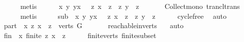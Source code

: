 \begin{isabellebody}
\ \ \ \ \isamarkupfalse%
\ metis\ \isanewline
\ \ \isamarkupfalse%
\ {\isachardoublequoteopen}{\isasymforall}\ x\ y{\isachardot}{\kern0pt}\ y{\isasymrightarrow}\isactrlsup {\isacharplus}{\kern0pt}x\ {\isasymlongrightarrow}\ \ {\isacharbraceleft}{\kern0pt}z{\isachardot}{\kern0pt}\ x\ {\isasymrightarrow}\isactrlsup {\isacharplus}{\kern0pt}\ z{\isacharbraceright}{\kern0pt}\ {\isasymsubseteq}\ {\isacharbraceleft}{\kern0pt}z{\isachardot}{\kern0pt}\ y\ {\isasymrightarrow}\isactrlsup {\isacharplus}{\kern0pt}\ z{\isacharbraceright}{\kern0pt}{\isachardoublequoteclose}\isanewline
\ \ \ \ \isamarkupfalse%
\ \ Collect{\isacharunderscore}{\kern0pt}mono\ trancl{\isacharunderscore}{\kern0pt}trans\isanewline
\ \ \ \ \isamarkupfalse%
\ metis\isanewline
\ \ \isamarkupfalse%
\ \isamarkupfalse%
\ sub{\isacharcolon}{\kern0pt}\ {\isachardoublequoteopen}{\isasymforall}\ x\ y{\isachardot}{\kern0pt}\ y{\isasymrightarrow}\isactrlsup {\isacharplus}{\kern0pt}x\ {\isasymlongrightarrow}\ \ {\isacharbraceleft}{\kern0pt}z{\isachardot}{\kern0pt}\ x\ {\isasymrightarrow}\isactrlsup {\isacharplus}{\kern0pt}\ z{\isacharbraceright}{\kern0pt}\ {\isasymsubset}\ {\isacharbraceleft}{\kern0pt}z{\isachardot}{\kern0pt}\ y\ {\isasymrightarrow}\isactrlsup {\isacharplus}{\kern0pt}\ z{\isacharbraceright}{\kern0pt}{\isachardoublequoteclose}\isanewline
\ \ \ \ \isamarkupfalse%
\ cycle{\isacharunderscore}{\kern0pt}free\ \isamarkupfalse%
\ auto\isanewline
\ \ \isamarkupfalse%
\ part{\isacharcolon}{\kern0pt}\ {\isachardoublequoteopen}{\isasymforall}\ x{\isachardot}{\kern0pt}\ {\isacharbraceleft}{\kern0pt}z{\isachardot}{\kern0pt}\ x\ {\isasymrightarrow}\isactrlsup {\isacharplus}{\kern0pt}\ z{\isacharbraceright}{\kern0pt}\ {\isasymsubseteq}\ verts\ G{\isachardoublequoteclose}\ \isanewline
\ \ \ \ \isamarkupfalse%
\ reachable{}{\isacharunderscore}{\kern0pt}in{\isacharunderscore}{\kern0pt}verts\ \ \isamarkupfalse%
\ auto\isanewline
\ \ \isamarkupfalse%
\ \isamarkupfalse%
\ fin{\isacharcolon}{\kern0pt}\ {\isachardoublequoteopen}{\isasymforall}\ x{\isachardot}{\kern0pt}\ finite\ {\isacharbraceleft}{\kern0pt}z{\isachardot}{\kern0pt}\ x\ {\isasymrightarrow}\isactrlsup {\isacharplus}{\kern0pt}\ z{\isacharbraceright}{\kern0pt}{\isachardoublequoteclose}\isanewline
\ \ \ \ \isamarkupfalse%
\ finite{\isacharunderscore}{\kern0pt}verts\ finite{\isacharunderscore}{\kern0pt}subset\isanewline

\end{isabellebody}
